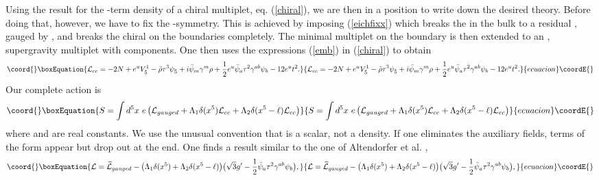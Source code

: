 \documentclass[a4paper,12pt, twoside]{article}
\numberwithin{equation}{section}
\begin{document}
Using the result for the \coordHE{}-term density of a chiral multiplet, eq. 
(\ref{chiral}), we are then in a position to write down the desired 
theory. Before doing that, however, we have to fix the \coordHE{}-symmetry. 
This is achieved by imposing (\ref{eichfixx}) which breaks the 
\coordHE{} in the bulk to a residual \coordHE{}, gauged by \coordHE{}, and breaks 
the chiral \coordHE{} on the boundaries completely. The minimal multiplet 
on the boundary is then extended to an \coordHE{}, \coordHE{} supergravity 
multiplet with \coordHE{} components. One then uses the expressions (\ref{emb}) 
in (\ref{chiral}) to obtain
\begin{equation}\coord{}\boxEquation{
{\cal L}_{cc}=-2N + e^u  V_{\dot 5}^1 - \bar{\rho}\tau^3\psi_{\dot 
5}+i\bar{\psi}_m\gamma^m\rho+\frac{1}{2}e^u 
\bar{\psi}_a\tau^2\gamma^{ab}\psi_b - 12 e^u t^2.\label{dM}
}{
{\cal L}_{cc}=-2N + e^u  V_{\dot 5}^1 - \bar{\rho}\tau^3\psi_{\dot 
5}+i\bar{\psi}_m\gamma^m\rho+\frac{1}{2}e^u 
\bar{\psi}_a\tau^2\gamma^{ab}\psi_b - 12 e^u t^2.}{ecuacion}\coordE{}\end{equation}
Our complete action is
\begin{equation}\coord{}\boxEquation{
S=\int d^5x~e\left( {\cal L}_{gauged} + \Lambda_1\delta(x^5){\cal 
L}_{cc}+\Lambda_2\delta(x^5-\ell){\cal L}_{cc}\right)\label{rs2}
}{
S=\int d^5x~e\left( {\cal L}_{gauged} + \Lambda_1\delta(x^5){\cal 
L}_{cc}+\Lambda_2\delta(x^5-\ell){\cal L}_{cc}\right)}{ecuacion}\coordE{}\end{equation}
where \coordHE{} and \coordHE{} are real constants. We use the 
unusual convention that \coordHE{} is a scalar, not a density. If one 
eliminates the auxiliary fields, terms of the form \coordHE{} appear 
but drop out at the end. One finds a result similar to the one of 
Altendorfer et al. \cite{Altendorfer:2000rr},
\begin{equation}\coord{}\boxEquation{
{\cal L}=\widetilde{\cal L}_{gauged}- 
\big(\Lambda_1\delta(x^5)+\Lambda_2\delta(x^5-\ell)\big)\big( 
\sqrt{3}g'-\frac{1}{2}\bar{\psi}_a\tau^2\gamma^{ab}\psi_b\big),\label{rslag}
}{
{\cal L}=\widetilde{\cal L}_{gauged}- 
\big(\Lambda_1\delta(x^5)+\Lambda_2\delta(x^5-\ell)\big)\big( 
\sqrt{3}g'-\frac{1}{2}\bar{\psi}_a\tau^2\gamma^{ab}\psi_b\big),}{ecuacion}\coordE{}\end{equation}
\end{document}
